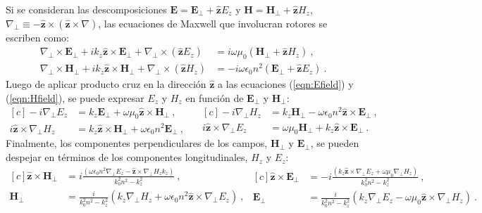 Si se consideran las descomposiciones $\textbf{E}=\textbf{E}_\perp +\hat{\textbf{z}} E_z$ y $\textbf{H}=\textbf{H}_\perp +\hat{\textbf{z}} H_z$, $\nabla_\perp \equiv - \hat{\textbf{z}}\times (\hat{\textbf{z}}\times\nabla)   $, las ecuaciones de Maxwell que involucran rotores se escriben como:
\begin{align}
	\nabla_\perp \times  \textbf{E}_\perp + ik_z \hat{\textbf{z}} \times \textbf{E}_\perp + \nabla_\perp \times (\hat{\textbf{z}} E_z) &= i\omega\mu_0(\textbf{H}_\perp +\hat{\textbf{z}} H_z) \ ,
	\label{eqn:Efield}
	\\
	\nabla_\perp \times  \textbf{H}_\perp + ik_z \hat{\textbf{z}} \times \textbf{H}_\perp + \nabla_\perp \times (\hat{\textbf{z}} H_z) &= -i\omega \epsilon_0 n^2 (\textbf{E}_\perp +\hat{\textbf{z}} E_z) \ .
	\label{eqn:Hfield}
\end{align}
Luego de aplicar producto cruz en la dirección $\hat{\textbf{z}}$ a las ecuaciones (\ref{eqn:Efield}) y (\ref{eqn:Hfield}), se puede expresar $E_z$ y $H_z$ en función de $\textbf{E}_\perp$ y $\textbf{H}_\perp$:
\begin{equation*}
\begin{aligned}[c]
	 -i\nabla_\perp E_z &= k_z\textbf{E}_\perp +\omega \mu_0 \hat{\textbf{z}} \times \textbf{H}_\perp \ ,
	 	  	 \\
	 	  	i\hat{\textbf{z}} \times \nabla_\perp H_z &= k_z \hat{\textbf{z}} \times\textbf{H}_\perp + \omega\epsilon_0 n^2 \textbf{E}_\perp \ ,
\end{aligned} 
\quad
\begin{aligned}[c]
	-i \nabla_\perp H_z &= k_z \textbf{H}_\perp - \omega \epsilon_0 n^2  \hat{\textbf{z}} \times \textbf{E}_\perp \ ,
	\\
	i\hat{\textbf{z}} \times\nabla_\perp E_z &=  \omega \mu_0 \textbf{H}_\perp+k_z  \hat{\textbf{z}} \times \textbf{E}_\perp \ .
\end{aligned}
\end{equation*}
Finalmente, los componentes perpendiculares de los campos, $\textbf{H}_\perp$ y $\textbf{E}_\perp$, se pueden despejar en términos de los componentes longitudinales, $H_z$ y $E_z$:
\begin{equation}
\begin{aligned}[c]
 \hat{\textbf{z}} \times \textbf{H}_\perp &= i\frac{(\omega\epsilon_0 n^2 \nabla_\perp E_z  - \hat{\textbf{z}} \times \nabla_\perp H_z k_z)}{k_0^2 n^2 - k_z^2} \ ,
 \\
\textbf{H}_\perp &= \frac{i}{k_0^2 n^2 - k_z^2}\left(k_z\nabla_\perp H_z + \omega \epsilon_0 n^2\hat{\textbf{z}} \times \nabla_\perp E_z\right) \ ,
\end{aligned}
\begin{aligned}[c]
	\hat{\textbf{z}} \times \textbf{E}_\perp &= -i\frac{(k_z\hat{\textbf{z}} \times \nabla_\perp E_z + \omega\mu_0 \nabla_\perp H_z)  }{k_0^2 n^2 - k_z^2} \ ,
	\\
\textbf{E}_\perp &= \frac{i}{k_0^2 n^2 - k_z^2}\left(k_z \nabla_\perp E_z - \omega\mu_0 \hat{\textbf{z}} \times \nabla_\perp H_z\right) \ . \label{eqn:transversal}
\end{aligned}
\end{equation}
